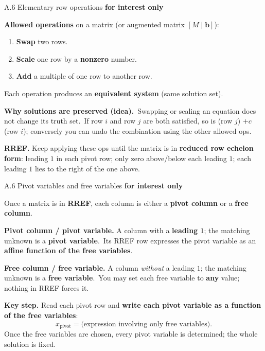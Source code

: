 \documentclass[11pt,aspectratio=169]{beamer}
\newcommand{\InterestOnly}{\textcolor{mAccent}{\textbf{for interest only}}}
\begin{document}
\begin{frame}{A.6 Elementary row operations}
  \footnotesize
  \InterestOnly

  \medskip
  \textbf{Allowed operations} on a matrix (or augmented matrix $[M\mid \mathbf{b}]$):
  \begin{enumerate}
    \item \textbf{Swap} two rows.
    \item \textbf{Scale} one row by a \textbf{nonzero} number.
    \item \textbf{Add} a multiple of one row to another row.
  \end{enumerate}
  Each operation produces an \textbf{equivalent system} (same solution set).

  \medskip
  \textbf{Why solutions are preserved (idea).}\
  Swapping or scaling an equation does not change its truth set.\
  If row $i$ and row $j$ are both satisfied, so is (row $j$) $+c\,$ (row $i$); conversely you can undo the combination using the other allowed ops.

  \medskip
  \textbf{RREF.} Keep applying these ops until the matrix is in \textbf{reduced row echelon form}:
  leading $1$ in each pivot row; only zero above/below each leading $1$; each leading $1$ lies to the right of the one above.
\end{frame}

\begin{frame}{A.6 Pivot variables and free variables}
  \footnotesize
  \InterestOnly

  \medskip
  Once a matrix is in \textbf{RREF}, each column is either a \textbf{pivot column} or a \textbf{free column}.

  \medskip
  \textbf{Pivot column / pivot variable.} A column with a \textbf{leading $1$}; the matching unknown is a \textbf{pivot variable}.\
  Its RREF row expresses the pivot variable as an \textbf{affine function of the free variables}.

  \medskip
  \textbf{Free column / free variable.} A column \emph{without} a leading $1$; the matching unknown is a \textbf{free variable}.\
  You may set each free variable to \textbf{any} value; nothing in RREF forces it.

  \medskip
  \textbf{Key step.} Read each pivot row and \textbf{write each pivot variable as a function of the free variables}:
  \[
    x_{\text{pivot}} = \text{(expression involving only free variables)}.
  \]
  Once the free variables are chosen, every pivot variable is determined; the whole solution is fixed.
\end{frame}
\end{document}
